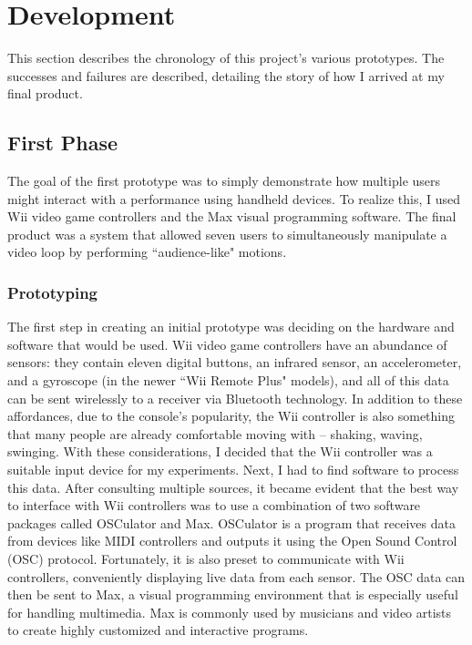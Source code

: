 \chapter{Development}

This section describes the chronology of this project's various prototypes. The successes and failures are described, detailing the story of how I arrived at my final product.


\section{First Phase}

The goal of the first prototype was to simply demonstrate how multiple users might interact with a performance using handheld devices. To realize this, I used Wii video game controllers and the Max visual programming software. The final product was a system that allowed seven users to simultaneously manipulate a video loop by performing ``audience-like" motions.


\subsection{Prototyping}

The first step in creating an initial prototype was deciding on the hardware and software that would be used. Wii video game controllers have an abundance of sensors: they contain eleven digital buttons, an infrared sensor, an accelerometer, and a gyroscope (in the newer ``Wii Remote Plus" models), and all of this data can be sent wirelessly to a receiver via Bluetooth technology. In addition to these affordances, due to the console's popularity, the Wii controller is also something that many people are already comfortable moving with -- shaking, waving, swinging. With these considerations, I decided that the Wii controller was a suitable input device for my experiments. Next, I had to find software to process this data. After consulting multiple sources, it became evident that the best way to interface with Wii controllers was to use a combination of two software packages called OSCulator and Max. OSCulator is a program that receives data from devices like MIDI controllers and outputs it using the Open Sound Control (OSC) protocol. Fortunately, it is also preset to communicate with Wii controllers, conveniently displaying live data from each sensor. The OSC data can then be sent to Max, a visual programming environment that is especially useful for handling multimedia. Max is commonly used by musicians and video artists to create highly customized and interactive programs.


